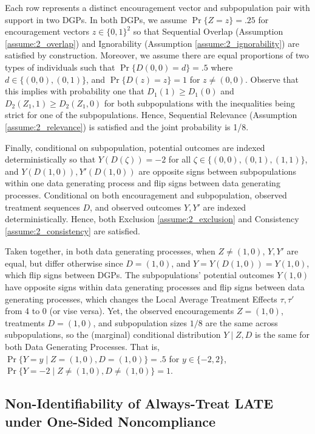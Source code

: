 Each row represents a distinct encouragement vector and subpopulation pair with support in two DGPs.
In both DGPs, we assume $\Pr\{Z=z\}=.25$ for encouragement vectors $z \in \{0,1\}^2$ so that Sequential Overlap (Assumption \ref{assume:2_overlap}) and Ignorability (Assumption \ref{assume:2_ignorability}) are satisfied by construction.
Moreover, we assume there are equal proportions of two types of individuals such that $\Pr\{D(0,0)=d\}=.5$ where $d \in\{(0,0), (0,1)\}$, and  $\Pr\{D(z)=z\}=1$ for $z \neq (0,0)$.
Observe that this implies with probability one that $D_1(1)\geq D_1(0)$ and $D_2(Z_1, 1) \geq D_2(Z_1, 0)$ for both subpopulations with the inequalities being strict for one of the subpopulations. 
Hence, Sequential Relevance (Assumption \ref{assume:2_relevance}) is satisfied and the joint probability is 1/8.

Finally, conditional on subpopulation, potential outcomes are indexed deterministically so that $Y(D(\zeta))=-2$ for all $\zeta \in \{(0,0), (0,1), (1,1)\}$, and $Y(D(1,0)), Y'(D(1,0))$ are opposite signs between subpopulations within one data generating process and flip signs between data generating processes.
Conditional on both encouragement and subpopulation, observed treatment sequences $D$, and observed outcomes $Y, Y'$ are indexed deterministically.
Hence, both Exclusion \ref{assume:2_exclusion} and Consistency \ref{assume:2_consistency} are satisfied.

Taken together, in both data generating processes, when $Z\neq(1,0)$, $Y,Y'$ are equal, but differ otherwise since $D=(1,0)$, and $Y=Y(D(1,0))=Y(1,0)$, which flip signs between DGPs.
The subpopulations' potential outcomes $Y(1,0)$ have opposite signs within data generating processes and flip signs between data generating processes, which changes the Local Average Treatment Effects $\tau, \tau'$ from 4 to 0 (or vise versa).
Yet, the observed encouragements $Z=(1,0)$, treatments $D=(1,0)$, and subpopulation sizes $1/8$ are the same across subpopulations, so the (marginal) conditional distribution $Y \mid Z, D$ is the same for both Data Generating Processes.
That is, $\Pr\{Y=y \mid Z=(1,0), D=(1,0)\}=.5$ for $y \in \{-2, 2\}$, $\Pr\{Y=-2 \mid Z\neq(1,0), D\neq(1,0)\}=1$.

\subsection{Non-Identifiability of Always-Treat LATE under One-Sided Noncompliance}

